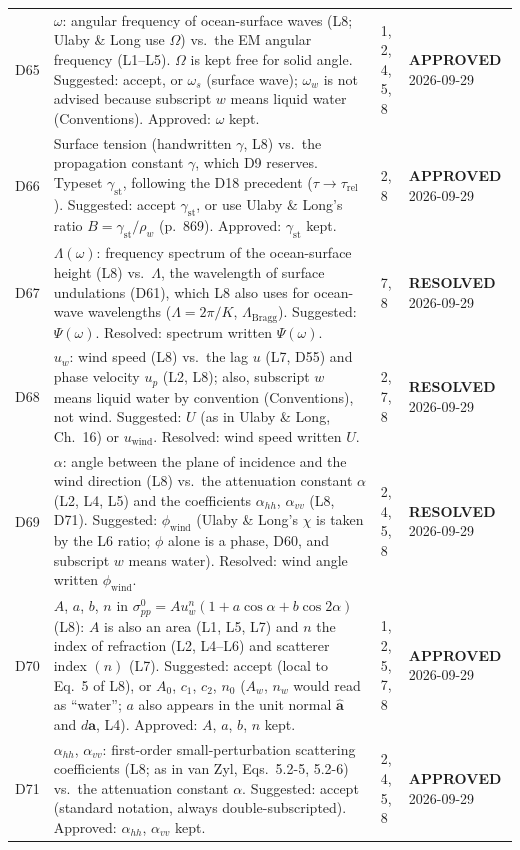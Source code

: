 \documentclass[11pt, oneside]{article}
\newcommand{\approved}{\textbf{APPROVED}}
\newcommand{\resolved}{\textbf{RESOLVED}}
\begin{document}
\begin{longtable}{l >{\raggedright\arraybackslash}p{} l l}
D65 & $\omega$: angular frequency of ocean-surface waves (L8; Ulaby \& Long use $\Omega$) vs.\ the EM angular frequency (L1--L5). $\Omega$ is kept free for solid angle. Suggested: accept, or $\omega_s$ (surface wave); $\omega_w$ is not advised because subscript $w$ means liquid water (Conventions). Approved: $\omega$ kept. & 1, 2, 4, 5, 8 & \approved{} 2026-09-29 \\
D66 & Surface tension (handwritten $\gamma$, L8) vs.\ the propagation constant $\gamma$, which D9 reserves. Typeset $\gamma_\mathrm{st}$, following the D18 precedent ($\tau \to \tau_\mathrm{rel}$). Suggested: accept $\gamma_\mathrm{st}$, or use Ulaby \& Long's ratio $B = \gamma_\mathrm{st}/\rho_w$ (p.~869). Approved: $\gamma_\mathrm{st}$ kept. & 2, 8 & \approved{} 2026-09-29 \\
D67 & $\Lambda(\omega)$: frequency spectrum of the ocean-surface height (L8) vs.\ $\Lambda$, the wavelength of surface undulations (D61), which L8 also uses for ocean-wave wavelengths ($\Lambda = 2\pi/K$, $\Lambda_\mathrm{Bragg}$). Suggested: $\Psi(\omega)$. Resolved: spectrum written $\Psi(\omega)$. & 7, 8 & \resolved{} 2026-09-29 \\
D68 & $u_w$: wind speed (L8) vs.\ the lag $u$ (L7, D55) and phase velocity $u_p$ (L2, L8); also, subscript $w$ means liquid water by convention (Conventions), not wind. Suggested: $U$ (as in Ulaby \& Long, Ch.~16) or $u_\mathrm{wind}$. Resolved: wind speed written $U$. & 2, 7, 8 & \resolved{} 2026-09-29 \\
D69 & $\alpha$: angle between the plane of incidence and the wind direction (L8) vs.\ the attenuation constant $\alpha$ (L2, L4, L5) and the coefficients $\alpha_{hh}$, $\alpha_{vv}$ (L8, D71). Suggested: $\phi_\mathrm{wind}$ (Ulaby \& Long's $\chi$ is taken by the L6 ratio; $\phi$ alone is a phase, D60, and subscript $w$ means water). Resolved: wind angle written $\phi_\mathrm{wind}$. & 2, 4, 5, 8 & \resolved{} 2026-09-29 \\
D70 & $A$, $a$, $b$, $n$ in $\sigma_{pp}^0 = Au_w^n(1 + a\cos\alpha + b\cos2\alpha)$ (L8): $A$ is also an area (L1, L5, L7) and $n$ the index of refraction (L2, L4--L6) and scatterer index $(n)$ (L7). Suggested: accept (local to Eq.~5 of L8), or $A_0$, $c_1$, $c_2$, $n_0$ ($A_w$, $n_w$ would read as ``water''; $a$ also appears in the unit normal $\hat{\mathbf{a}}$ and $d\mathbf{a}$, L4). Approved: $A$, $a$, $b$, $n$ kept. & 1, 2, 5, 7, 8 & \approved{} 2026-09-29 \\
D71 & $\alpha_{hh}$, $\alpha_{vv}$: first-order small-perturbation scattering coefficients (L8; as in van Zyl, Eqs.~5.2-5, 5.2-6) vs.\ the attenuation constant $\alpha$. Suggested: accept (standard notation, always double-subscripted). Approved: $\alpha_{hh}$, $\alpha_{vv}$ kept. & 2, 4, 5, 8 & \approved{} 2026-09-29 \\

\end{longtable}
\end{document}
